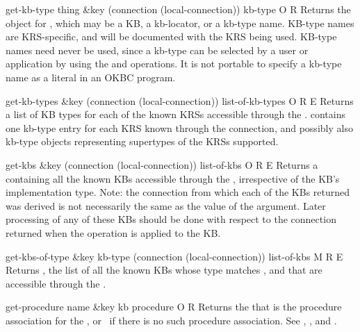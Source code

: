 \begin{okbcop}{get-kb-type}{ thing \&key (connection (local-connection))} { kb-type } { O } { R } {  }
Returns the  object for , which may be a KB,
   a kb-locator, or a kb-type name.  KB-type names are KRS-specific, and
   will be documented with the KRS being used.  KB-type names need never be
   used, since a kb-type can be selected by a user or application by using
   the  and  operations.  It is not
   portable to specify a kb-type name as a literal in an OKBC program.
\end{okbcop}

\begin{okbcop}{get-kb-types}{ \&key (connection (local-connection))} { list-of-kb-types } { O } { R } { E }
Returns a list of KB types for each of the known KRSs accessible
   through the .   contains one
   kb-type entry for each KRS known through the connection, and possibly also
   kb-type objects representing supertypes of the KRSs supported.
\end{okbcop}

\begin{okbcop}{get-kbs}{ \&key (connection (local-connection))} { list-of-kbs } { O } { R } { E }
Returns a  containing all the known KBs accessible 
   through the , irrespective of the KB's implementation
   type.  Note: the connection from which each of the KBs returned was derived
   is not necessarily the same as the value of the 
   argument.  Later processing of any of these KBs should be done with
   respect to the connection returned when the  operation
   is applied to the KB.
\end{okbcop}

\begin{okbcop}{get-kbs-of-type}{ \&key kb-type (connection (local-connection))} { list-of-kbs } { M } { R } { E }
Returns , the list of all the known KBs whose type
   matches , and that are accessible through the
   .
\end{okbcop}

\begin{okbcop}{get-procedure}{ name \&key kb} { procedure } { O } { R } {  }
Returns the  that is the procedure association for
   the , or \false\ if there is no such procedure association.
   See , , and
   .
\end{okbcop}


